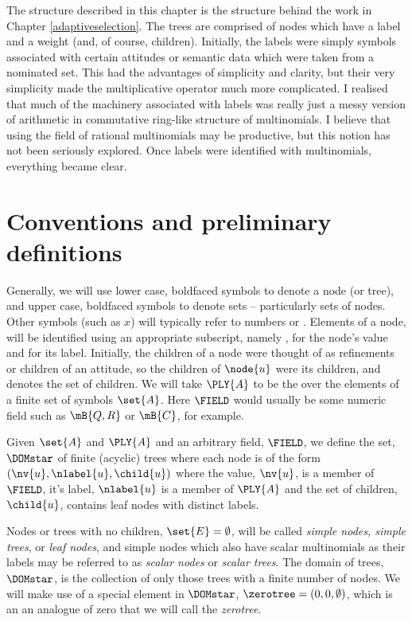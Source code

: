 The structure described in this chapter is the structure behind the
work in Chapter \ref{adaptiveselection}.  The trees are comprised of
nodes which have a label and a weight (and, of course, children).
Initially, the labels were simply symbols associated with certain
attitudes or semantic data which were taken from a nominated set.
This had the advantages of simplicity and clarity, but their very
simplicity made the multiplicative operator much more complicated. I
realised that much of the machinery associated with labels was really
just a messy version of arithmetic in commutative ring-like structure of
multinomials. I believe that using the field of rational multinomials
may be productive, but this notion has not been seriously explored.
Once labels were identified with multinomials, everything became
clear.

\section{Conventions and preliminary definitions}

Generally, we will use lower case, boldfaced symbols to denote a node
(or tree), and upper case, boldfaced symbols to denote sets  -- 
particularly sets of nodes.  Other symbols (such as \(x\)) will
typically refer to numbers or \polyrat \polyforms. Elements of a
node,  will be identified using an appropriate subscript,
namely , for the node's value and  for its
label. Initially, the children of a node were thought of as
refinements or children of an attitude, so the children of $\node{u}$
were its children, and  denotes the set of children.  We will
take $\PLY{A}$ to be the \polytypes over the elements of a finite set
of symbols $\set{A}$.  Here $\FIELD$ would usually be some numeric
field such as $\mB{Q, R}$ or $\mB{C}$, for example.

\begin{definition}\label{def-of-dom}
  Given $\set{A}$ and $\PLY{A}$ and an arbitrary field, $\FIELD$, we
  define the set, $\DOMstar$ of finite (acyclic) trees where each node is
  of the form $(\nv{u}, \nlabel{u}, \child{u})$ where the value,
  $\nv{u}$, is a member of $\FIELD$, it's label, $\nlabel{u}$ is
  a member of $\PLY{A}$ and the set of children, $\child{u}$, contains
  leaf nodes with distinct labels.
\end{definition}

Nodes or trees with no children, \(\set{E} = \emptyset\), will be
called \emph{simple nodes, simple trees}, or \emph{leaf nodes}, and
simple nodes which also have scalar multinomials as their labels may
be referred to as \emph{scalar nodes} or \emph{scalar trees}. The
domain of trees, $\DOMstar$, is the collection of only those trees
with a finite number of nodes.  We will make use of a special element
in $\DOMstar$, $\zerotree = (0, 0, \emptyset)$, which is an an
analogue of zero that we will call the \emph{zerotree}.

